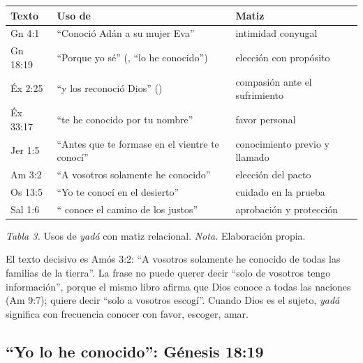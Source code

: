 \begin{center}\small\renewcommand{\arraystretch}{1.2}
\begin{tabular}{@{}L{2.0cm}L{6.4cm}L{6.0cm}@{}}
\toprule
\textbf{Texto} & \textbf{Uso de } & \textbf{Matiz} \\ \midrule
Gn 4:1 & ``Conoció Adán a su mujer Eva'' & intimidad conyugal \\
Gn 18:19 & ``Porque yo sé'' (, ``lo he conocido'') & elección con propósito \\
Éx 2:25 & ``y los reconoció Dios'' () & compasión ante el sufrimiento \\
Éx 33:17 & ``te he conocido por tu nombre'' & favor personal \\
Jer 1:5 & ``Antes que te formase en el vientre te conocí'' & conocimiento previo y llamado \\
Am 3:2 & ``A vosotros solamente he conocido'' & elección del pacto \\
Os 13:5 & ``Yo te conocí en el desierto'' & cuidado en la prueba \\
Sal 1:6 & ``\SENOR{} conoce el camino de los justos'' & aprobación y protección \\
\bottomrule
\end{tabular}\par
{\footnotesize\color{gris}\textit{Tabla 3.} Usos de \emph{yadá} con matiz relacional. \textit{Nota.} Elaboración propia.}
\end{center}

El texto decisivo es Amós 3:2: ``A vosotros solamente he conocido de todas las familias de la tierra''. La frase no puede querer decir ``solo de vosotros tengo información'', porque el mismo libro afirma que Dios conoce a todas las naciones (Am 9:7); quiere decir ``solo a vosotros escogí''. Cuando Dios es el sujeto, \emph{yadá} significa con frecuencia conocer con favor, escoger, amar.


\subsection{“Yo lo he conocido”: Génesis 18:19}

